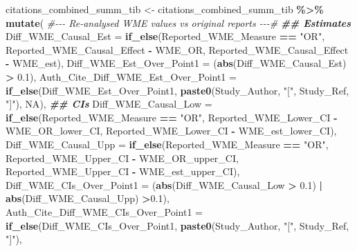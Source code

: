 \documentclass[
]{article}
\newenvironment{Shaded}{\begin{snugshade}}{\end{snugshade}}
\newcommand{\AttributeTok}[1]{\textcolor[rgb]{0.13,0.29,0.53}{#1}}
\newcommand{\CommentTok}[1]{\textcolor[rgb]{0.56,0.35,0.01}{\textit{#1}}}
\newcommand{\ConstantTok}[1]{\textcolor[rgb]{0.56,0.35,0.01}{#1}}
\newcommand{\DocumentationTok}[1]{\textcolor[rgb]{0.56,0.35,0.01}{\textbf{\textit{#1}}}}
\newcommand{\FloatTok}[1]{\textcolor[rgb]{0.00,0.00,0.81}{#1}}
\newcommand{\FunctionTok}[1]{\textcolor[rgb]{0.13,0.29,0.53}{\textbf{#1}}}
\newcommand{\NormalTok}[1]{#1}
\newcommand{\OtherTok}[1]{\textcolor[rgb]{0.56,0.35,0.01}{#1}}
\newcommand{\SpecialCharTok}[1]{\textcolor[rgb]{0.81,0.36,0.00}{\textbf{#1}}}
\newcommand{\StringTok}[1]{\textcolor[rgb]{0.31,0.60,0.02}{#1}}
\begin{document}
\begin{Shaded}
\begin{Highlighting}[]
\NormalTok{citations\_combined\_summ\_tib }\OtherTok{\textless{}{-}}\NormalTok{ citations\_combined\_summ\_tib }\SpecialCharTok{\%\textgreater{}\%} 
  \FunctionTok{mutate}\NormalTok{(}
    \CommentTok{\#{-}{-}{-} Re{-}analysed WME values vs original reports {-}{-}{-}\#}
    \DocumentationTok{\#\# Estimates}
    \AttributeTok{Diff\_WME\_Causal\_Est =} \FunctionTok{if\_else}\NormalTok{(Reported\_WME\_Measure }\SpecialCharTok{==} \StringTok{"OR"}\NormalTok{,}
\NormalTok{                                  Reported\_WME\_Causal\_Effect }\SpecialCharTok{{-}}\NormalTok{ WME\_OR,}
\NormalTok{                                  Reported\_WME\_Causal\_Effect }\SpecialCharTok{{-}}\NormalTok{ WME\_est),}
    \AttributeTok{Diff\_WME\_Est\_Over\_Point1 =}\NormalTok{ (}\FunctionTok{abs}\NormalTok{(Diff\_WME\_Causal\_Est) }\SpecialCharTok{\textgreater{}} \FloatTok{0.1}\NormalTok{),}
    \AttributeTok{Auth\_Cite\_Diff\_WME\_Est\_Over\_Point1 =} \FunctionTok{if\_else}\NormalTok{(Diff\_WME\_Est\_Over\_Point1,}
                                             \FunctionTok{paste0}\NormalTok{(Study\_Author, }\StringTok{"["}\NormalTok{, Study\_Ref, }\StringTok{"]"}\NormalTok{),}
                                             \ConstantTok{NA}\NormalTok{),}
    \DocumentationTok{\#\# CIs}
    \AttributeTok{Diff\_WME\_Causal\_Low =} \FunctionTok{if\_else}\NormalTok{(Reported\_WME\_Measure }\SpecialCharTok{==} \StringTok{"OR"}\NormalTok{,}
\NormalTok{                                  Reported\_WME\_Lower\_CI }\SpecialCharTok{{-}}\NormalTok{ WME\_OR\_lower\_CI,}
\NormalTok{                                  Reported\_WME\_Lower\_CI }\SpecialCharTok{{-}}\NormalTok{ WME\_est\_lower\_CI),}
    \AttributeTok{Diff\_WME\_Causal\_Upp =} \FunctionTok{if\_else}\NormalTok{(Reported\_WME\_Measure }\SpecialCharTok{==} \StringTok{"OR"}\NormalTok{,}
\NormalTok{                                  Reported\_WME\_Upper\_CI }\SpecialCharTok{{-}}\NormalTok{ WME\_OR\_upper\_CI,}
\NormalTok{                                  Reported\_WME\_Upper\_CI }\SpecialCharTok{{-}}\NormalTok{ WME\_est\_upper\_CI),}
    \AttributeTok{Diff\_WME\_CIs\_Over\_Point1 =}\NormalTok{ (}\FunctionTok{abs}\NormalTok{(Diff\_WME\_Causal\_Low }\SpecialCharTok{\textgreater{}} \FloatTok{0.1}\NormalTok{) }\SpecialCharTok{|} \FunctionTok{abs}\NormalTok{(Diff\_WME\_Causal\_Upp) }\SpecialCharTok{\textgreater{}}\FloatTok{0.1}\NormalTok{),}
    \AttributeTok{Auth\_Cite\_Diff\_WME\_CIs\_Over\_Point1 =} \FunctionTok{if\_else}\NormalTok{(Diff\_WME\_CIs\_Over\_Point1,}
                                             \FunctionTok{paste0}\NormalTok{(Study\_Author, }\StringTok{"["}\NormalTok{, Study\_Ref, }\StringTok{"]"}\NormalTok{),}

\end{Highlighting}
\end{Shaded}
\end{document}

